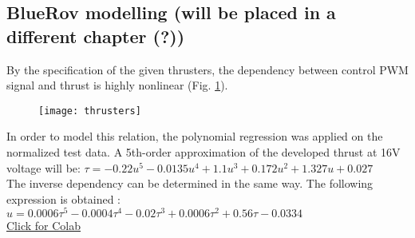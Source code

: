     \subsection{BlueRov modelling (will be placed in a different chapter (?))}

    By the specification of the given thrusters, the dependency between control 
    PWM signal and thrust is highly nonlinear
    (Fig. \ref{image:thrust}).\\
    \begin{figure}[H]
        \centering\texttt{[image: thrusters]}
        \caption{}
        \label{image:thrust}
    \end{figure}
    In order to model this relation, the polynomial regression was applied on the normalized test data. 
    A 5th-order approximation of the developed thrust at 16V voltage will be:
    $
    \tau = - 0.22 u^5
    - 0.0135 u^4
    + 1.1 u^3
    + 0.172 u^2
    + 1.327 u 
    + 0.027
    $\\
    The inverse dependency can be determined in the same way. 
    The following expression is obtained :
    $
    u = 0.0006 \tau^5 
    - 0.0004 \tau^4 
    - 0.02 \tau^3
    + 0.0006 \tau^2 
    + 0.56 \tau
    -0.0334
    $\\
    \href{https://colab.research.google.com/drive/1XaNNENZPk88yaddOYy01vXtHd8_YwT2m?usp=sharing}{Click for Colab}